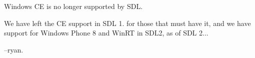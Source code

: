 Windows CE is no longer supported by SDL.

We have left the CE support in SDL 1. for those that must have it, and we have support for Windows Phone 8 and Win\+RT in SDL2, as of SDL 2...

--ryan. 